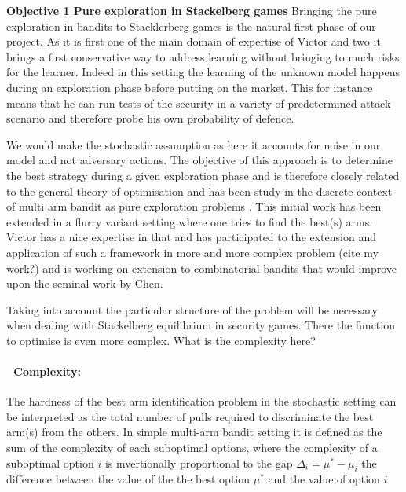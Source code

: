 \textbf{Objective 1 Pure exploration in Stackelberg games}
Bringing the pure exploration in bandits to Stacklerberg games is the natural first phase of our project. As it is first one of the main domain of expertise of Victor and two it brings a first conservative way to address learning without bringing to much risks for the learner. Indeed in this setting the learning of the unknown model happens during an exploration phase before putting on the market.  This for instance means that he can run tests of the security in a variety of predetermined attack scenario and therefore  probe his own probability of defence.

We would make the stochastic assumption as here it accounts for noise in our model and not adversary actions.
 The objective of this  approach is to determine  the best strategy during a given exploration phase and  is therefore  closely related to the general theory of optimisation and has been study in the discrete context of multi arm bandit as pure exploration problems \cite{Audibert10BA}. This initial work has been extended in a flurry variant setting where one tries to find the best(s) arms.
Victor has a nice expertise in that and has participated to the extension and application of such a framework in more and more complex problem (cite my work?) and is working on extension to combinatorial bandits that would improve upon the seminal work by Chen.


 Taking into account the particular  structure of the problem will be necessary when dealing with Stackelberg equilibrium in security games. There the function to optimise is even more complex. What is the complexity here?
 
 \paragraph{\textbullet$\;$  Complexity:} The hardness of the best arm identification problem in the stochastic setting can be interpreted as the total number of pulls required to discriminate the best arm(s) from the others. In simple multi-arm bandit setting it is defined as the sum of the complexity of each suboptimal options, where the complexity of a suboptimal option $i$ is invertionally proportional to the gap $\Delta_i= \mu^*- \mu_i$  the difference between the value of the the best option $\mu^*$ and the value of option $i$
 
